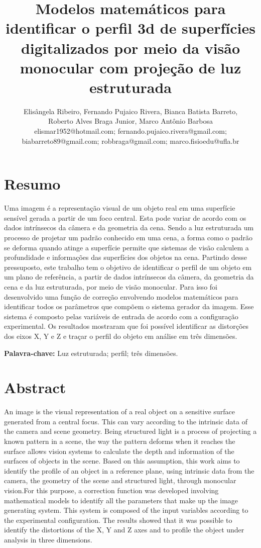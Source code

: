 \documentclass[a4paper, 12pt]{article}
\title{Modelos matemáticos para identificar o perfil 3d de superfícies digitalizados por meio da visão monocular com projeção de luz estruturada}
\author{Elisângela Ribeiro, Fernando Pujaico Rivera, Bianca Batista Barreto,\\Roberto Alves Braga Junior, Marco Antônio Barbosa 
\\elismar1952@hotmail.com; fernando.pujaico.rivera@gmail.com;
\\biabarreto89@gmail.com; robbraga@gmail.com; marco.fisioedu@ufla.br}
\begin{document}
\maketitle

\section*{Resumo}
Uma imagem é a representação visual de um objeto real em uma superfície sensível gerada a partir de um foco central. Esta pode variar de acordo com os dados intrínsecos da câmera e da geometria da cena. Sendo a luz estruturada um processo de projetar um padrão conhecido em uma cena, a forma como o padrão se deforma quando atinge a superfície permite que sistemas de visão calculem a profundidade e informações das superfícies dos objetos na cena. Partindo desse pressuposto, este trabalho tem o objetivo de identificar o perfil de um objeto em um plano de referência, a partir de dados intrínsecos da câmera, da geometria da cena e da luz estruturada, por meio de visão monocular. Para isso foi desenvolvido uma função de correção envolvendo modelos matemáticos para identificar todos os parâmetros que compõem o sistema gerador da imagem. Esse sistema é composto pelas variáveis de entrada de acordo com a configuração experimental. Os resultados mostraram que foi possível identificar as distorções dos eixos X, Y e Z e traçar o perfil do objeto em análise em três dimensões.


\textbf{Palavra-chave:}  Luz estruturada; perfil; três dimensões.

\section*{Abstract}

An image is the visual representation of a real object on a sensitive surface generated from a central focus. This can vary according to the intrinsic data of the camera and scene geometry. Being structured light is a process of projecting a known pattern in a scene, the way the pattern deforms when it reaches the surface allows vision systems to calculate the depth and information of the surfaces of objects in the scene. Based on this assumption, this work aims to identify the profile of an object in a reference plane, using intrinsic data from the camera, the geometry of the scene and structured light, through monocular vision.For this purpose, a correction function was developed involving mathematical models to identify all the parameters that make up the image generating system. This system is composed of the input variables according to the experimental configuration. The results showed that it was possible to identify the distortions of the X, Y and Z axes and to profile the object under analysis in three dimensions.
\end{document}
